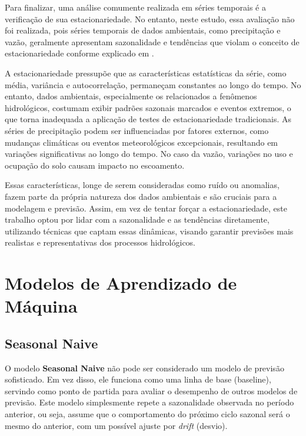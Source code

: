 Para finalizar, uma análise comumente realizada em séries temporais é a verificação de sua estacionariedade. No entanto, neste estudo, essa avaliação não foi realizada, pois séries temporais de dados ambientais, como precipitação e vazão, geralmente apresentam sazonalidade e tendências que violam o conceito de estacionariedade conforme explicado em \citet{hyndman_fpp3_2024}.

A estacionariedade pressupõe que as características estatísticas da série, como média, variância e autocorrelação, permaneçam constantes ao longo do tempo. No entanto, dados ambientais, especialmente os relacionados a fenômenos hidrológicos, costumam exibir padrões sazonais marcados e eventos extremos, o que torna inadequada a aplicação de testes de estacionariedade tradicionais. As séries de precipitação podem ser influenciadas por fatores externos, como mudanças climáticas ou eventos meteorológicos excepcionais, resultando em variações significativas ao longo do tempo. No caso da vazão, variações no uso e ocupação do solo causam impacto no escoamento.

Essas características, longe de serem consideradas como ruído ou anomalias, fazem parte da própria natureza dos dados ambientais e são cruciais para a modelagem e previsão. Assim, em vez de tentar forçar a estacionariedade, este trabalho optou por lidar com a sazonalidade e as tendências diretamente, utilizando técnicas que captam essas dinâmicas, visando garantir previsões mais realistas e representativas dos processos hidrológicos.

\section{Modelos de Aprendizado de Máquina}

\subsection{Seasonal Naive}

O modelo \textbf{Seasonal Naive} não pode ser considerado um modelo de previsão sofisticado. Em vez disso, ele funciona como uma linha de base (baseline), servindo como ponto de partida para avaliar o desempenho de outros modelos de previsão. Este modelo simplesmente repete a sazonalidade observada no período anterior, ou seja, assume que o comportamento do próximo ciclo sazonal será o mesmo do anterior, com um possível ajuste por \textit{drift} (desvio).\cite{hyndman_fpp3_2024}

